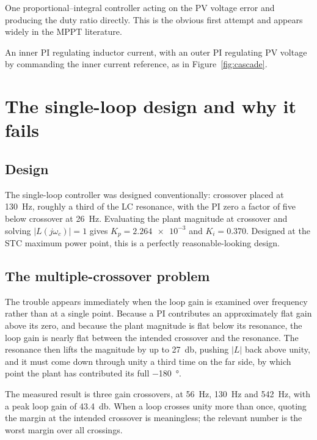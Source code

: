 \begin{description}[leftmargin=0pt, style=unboxed]
\item[Single-loop.] One proportional--integral controller acting on the PV
  voltage error and producing the duty ratio directly. This is the obvious first
  attempt and appears widely in the MPPT literature.
\item[Cascade.] An inner PI regulating inductor current, with an outer PI
  regulating PV voltage by commanding the inner current reference, as in
  Figure~\ref{fig:cascade}.
\end{description}

\section{The single-loop design and why it fails}

\subsection{Design}

The single-loop controller was designed conventionally: crossover placed at
\SI{130}{\hertz}, roughly a third of the LC resonance, with the PI zero a factor
of five below crossover at \SI{26}{\hertz}. Evaluating the plant magnitude at
crossover and solving $|L(j\omega_c)| = 1$ gives $K_p = \num{2.264e-3}$ and
$K_i = \num{0.370}$. Designed at the STC maximum power point, this is a
perfectly reasonable-looking design.

\subsection{The multiple-crossover problem}

The trouble appears immediately when the loop gain is examined over frequency
rather than at a single point. Because a PI contributes an approximately flat
gain above its zero, and because the plant magnitude is flat below its
resonance, the loop gain is nearly flat between the intended crossover and the
resonance. The resonance then lifts the magnitude by up to \SI{27}{\decibel},
pushing $|L|$ back above unity, and it must come down through unity a third
time on the far side, by which point the plant has contributed its full
\SI{-180}{\degree}.

The measured result is three gain crossovers, at \SI{56}{\hertz},
\SI{130}{\hertz} and \SI{542}{\hertz}, with a peak loop gain of
\SI{43.4}{\decibel}. When a loop crosses unity more than once, quoting the
margin at the intended crossover is meaningless; the relevant number is the
worst margin over all crossings.

